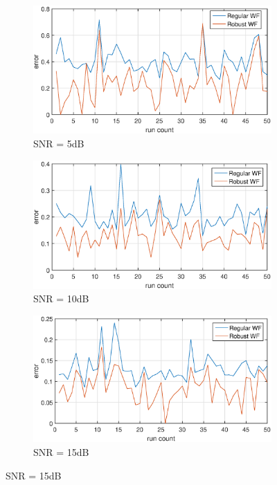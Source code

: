 \begin{figure}
     \centering
     \begin{subfigure}[b]{0.75\textwidth}
         \centering
         \includegraphics[width=\textwidth]{figs/snr_5db}
         \caption{SNR = 5dB}
         \label{fig:y equals x}
     \end{subfigure}
     \hfill
     \begin{subfigure}[b]{0.75\textwidth}
         \centering
         \includegraphics[width=\textwidth]{figs/snr_10db}
         \caption{SNR = 10dB}
         \label{fig:three sin x}
     \end{subfigure}
     \hfill
     \begin{subfigure}[b]{0.75\textwidth}
         \centering
         \includegraphics[width=\textwidth]{figs/snr_15db}
         \caption{SNR = 15dB}
         \label{fig:five over x}
     \end{subfigure}
 \end{figure}
 
